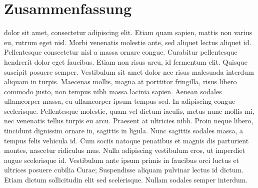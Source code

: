 \chapter*{Zusammenfassung}


dolor sit amet, consectetur adipiscing elit.
Etiam quam sapien, mattis non varius eu, rutrum eget nisl.
Morbi venenatis molestie ante, sed aliquet lectus aliquet id.
Pellentesque consectetur nisl a massa ornare congue.
Curabitur pellentesque hendrerit dolor eget faucibus.
Etiam non risus arcu, id fermentum elit.
Quisque suscipit posuere semper.
Vestibulum sit amet dolor nec risus malesuada interdum aliquam in turpis.
Maecenas mollis, magna at porttitor fringilla, risus libero commodo justo, non tempus nibh massa lacinia sapien.
Aenean sodales ullamcorper massa, eu ullamcorper ipsum tempus sed.
In adipiscing congue scelerisque.
Pellentesque molestie, quam vel dictum iaculis, metus nunc mollis mi, nec venenatis tellus turpis eu arcu.
Praesent at ultricies nibh.
Proin neque libero, tincidunt dignissim ornare in, sagittis in ligula.
Nunc sagittis sodales massa, a tempus felis vehicula id.
Cum sociis natoque penatibus et magnis dis parturient montes, nascetur ridiculus mus.
Nulla adipiscing vestibulum eros, ut imperdiet augue scelerisque id.
Vestibulum ante ipsum primis in faucibus orci luctus et ultrices posuere cubilia Curae;
Suspendisse aliquam pulvinar lectus id dictum.
Etiam dictum sollicitudin elit sed scelerisque.
Nullam sodales semper interdum.
